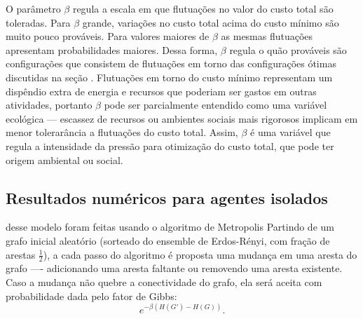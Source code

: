 O parâmetro $\beta$ regula a escala em que flutuações no valor do custo total são toleradas. Para $\beta$ grande, variações no custo total acima do custo mínimo são muito pouco prováveis. Para valores maiores de $\beta$ as mesmas flutuações apresentam probabilidades maiores. Dessa forma, $\beta$ regula o quão prováveis são configurações que consistem de flutuações em torno das configurações ótimas discutidas na seção \emph{}. Flutuações em torno do custo mínimo representam um dispêndio extra de energia e recursos que poderiam ser gastos em outras atividades, portanto $\beta$ pode ser parcialmente entendido como uma variável ecológica --- escassez de recursos ou ambientes sociais mais rigorosos implicam em menor tolerarância a flutuações do custo total. Assim, $\beta$ é uma variável que regula a intensidade da pressão para otimização do custo total, que pode ter origem ambiental ou social. 

\subsection{Resultados numéricos para agentes isolados}
 desse modelo foram feitas usando o algoritmo de Metropolis\cite{landau2005} Partindo de um grafo inicial aleatório (sorteado do ensemble de Erdos-Rényi, com fração de arestas $\frac{1}{2}$), a cada passo do algoritmo é proposta uma mudança em uma aresta do grafo ---- adicionando uma aresta faltante ou removendo uma aresta existente. Caso a mudança não quebre a conectividade do grafo, ela será aceita com probabilidade dada pelo fator de Gibbs: 
\begin{equation}
\label{eq:gibbsfactor}
e^{-\beta \left(H(G') - H(G)\right)}.
\end{equation}


